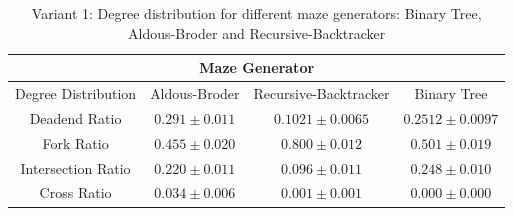 \begin{table}[!h]
    \begin{center} 
        \caption{Variant 1: Degree distribution for different maze generators: Binary Tree, Aldous-Broder and Recursive-Backtracker} 
    \begin{tabular}{ c c c c} 
    \multicolumn{4}{c}{Maze Generator} \\
    \hline
Degree Distribution&Aldous-Broder&Recursive-Backtracker&Binary Tree\\
    \hline
Deadend Ratio&$0.291\pm 0.011$&$0.1021\pm 0.0065$&$0.2512\pm 0.0097$\\    
    \hline
Fork Ratio&$0.455\pm 0.020$&$0.800\pm 0.012$&$0.501\pm 0.019$\\
    \hline
Intersection Ratio&$0.220\pm 0.011$&$0.096\pm 0.011$&$0.248\pm 0.010$\\    
    \hline
Cross Ratio&$0.034\pm 0.006$&$0.001\pm 0.001$&$0.000\pm 0.000$\\    
    \hline   
     \end{tabular} 
    \end{center}
     \end{table}

